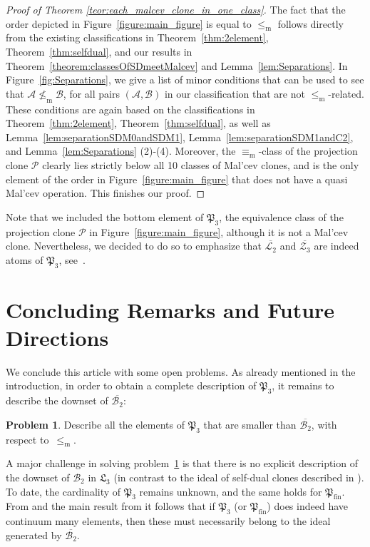 \documentclass[12pt]{amsart}
\theoremstyle{definition}
\newtheorem{problem}[theorem]{Problem}
\theoremstyle{definition}
\newcommand{\Pfin}{\mathfrak P_{\mathrm{fin}}}
\newcommand{\Pthree}{\mathfrak P_{3}}
\newcommand{\clo}[1]{\mathcal{#1}}
\newcommand{\isaminorof}{\leq_{\mathrm{m}}}
\newcommand{\notisaminorof}{\nleq_{\mathrm{m}}}
\newcommand{\minorequivalentto}{\equiv_{\mathrm{m}}}
\begin{document}
\begin{proof}[Proof of Theorem \ref{teor:each_malcev_clone_in_one_class}]
The fact that the order depicted in Figure~\ref{figure:main_figure} is equal to $\isaminorof$ follows directly from the existing classifications in Theorem~\ref{thm:2element}, Theorem~\ref{thm:selfdual}, and our results in Theorem~\ref{theorem:classesOfSDmeetMalcev} and Lemma~\ref{lem:Separations}. In Figure~\ref{fig:Separations}, we give a list of minor conditions that can be used to see that $\mathcal A\notisaminorof \mathcal B$, for all pairs $(\mathcal A, \mathcal B)$ in our classification that are not $\isaminorof$-related. These conditions  are again based on the classifications in Theorem~\ref{thm:2element}, Theorem~\ref{thm:selfdual}, as well as Lemma~\ref{lem:separationSDM0andSDM1}, Lemma~\ref{lem:separationSDM1andC2}, and Lemma~\ref{lem:Separations} (2)-(4). Moreover, the $\minorequivalentto$-class of the projection clone $\clo{P}$ clearly lies strictly below all 10 classes of Mal'cev clones, and is the only element of the order in Figure~\ref{figure:main_figure} that does not have a quasi Mal'cev operation. This finishes our proof.
\end{proof}


Note that we included the bottom element of $\Pthree$, the equivalence class of the projection clone $\clo{P}$ in Figure~\ref{figure:main_figure}, although it is not a Mal’cev clone. Nevertheless, we decided to do so to emphasize that $\overline{\clo{L}_2}$ and $\overline{\clo{Z}_3}$ are indeed atoms of $\Pthree$, see~\cite{MinTaylorOver3}.

\section{Concluding Remarks and Future Directions} \label{sec:future}

We conclude this article with some open problems. As already mentioned in the introduction, in order to obtain a complete description of $\Pthree$, it remains to describe the downset of $\overline{\clo{B}_2}$:

\begin{problem} \label{prob:Prob1}
Describe all the elements of $\Pthree$ that are smaller than $\overline{\clo{B}_2}$, with respect to~$\isaminorof$.
\end{problem}

A major challenge in solving problem~\ref{prob:Prob1} is that there is no explicit description of the downset of $\clo{B}_2$ in $\mathfrak L_3$ (in contrast to the ideal of self-dual clones described in \cite{Zhuk15}). To date, the cardinality of $\Pthree$ remains unknown, and the same holds for $\Pfin$. From \cite[Theorem 2.13]{VucajZhuk} and the main result from \cite{AichingerMayrMcKenzie} it follows that if $\Pthree$ (or $\Pfin$) does indeed have continuum many elements, then these must necessarily belong to the ideal generated by $\overline{\clo{B}_2}$.
\end{document}
